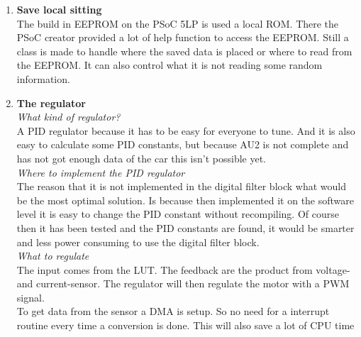 \begin{enumerate}
	\item \textbf{Save local sitting}\\
	The build in EEPROM on the PSoC 5LP is used a local ROM. There the PSoC creator provided a lot of help function to access the EEPROM. Still a class is made to handle where the saved data is placed or where to read from the EEPROM. It can also control what it is not reading some random information.\\ 
	\item \textbf{The regulator}\\
	\subitem \textit{What kind of regulator?}\\
	A PID regulator because it has to be easy for everyone to tune. And it is also easy to calculate some PID constants, but because AU2 is not complete and has not got enough data of the car this isn't possible yet.\\
	\subitem \textit{Where to implement the PID regulator}\\
	The reason that it is not implemented in the digital filter block what would be the most optimal solution. Is because then implemented it on the software level it is easy to change the PID constant without recompiling. Of course then it has been tested and the PID constants are found, it would be smarter and less power consuming to use the digital filter block.\\
	\subitem \textit{What to regulate}\\
	The input comes from the LUT. The feedback are the product from voltage- and current-sensor. The regulator will then regulate the motor with a PWM signal.\\
	To get data from the sensor a DMA is setup. So no need for a interrupt routine every time a conversion is done. This will also save a lot of CPU time\\
\end{enumerate}

